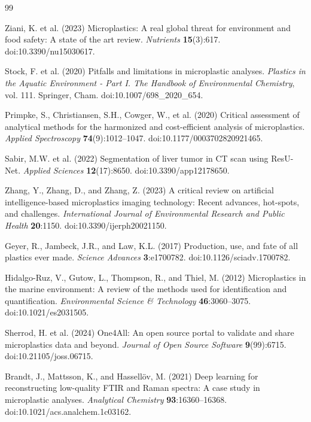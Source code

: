 \documentclass{article}
\begin{document}
{\small

\begin{thebibliography}{99}

Ziani, K. et al. (2023) Microplastics: A real global threat for environment and food safety: A state of the art review. \textit{Nutrients} \textbf{15}(3):617. doi:10.3390/nu15030617.

Stock, F. et al. (2020) Pitfalls and limitations in microplastic analyses. \textit{Plastics in the Aquatic Environment - Part I. The Handbook of Environmental Chemistry}, vol. 111. Springer, Cham. doi:10.1007/698\_2020\_654.

Primpke, S., Christiansen, S.H., Cowger, W., et al. (2020) Critical assessment of analytical methods for the harmonized and cost-efficient analysis of microplastics. \textit{Applied Spectroscopy} \textbf{74}(9):1012--1047. doi:10.1177/0003702820921465.

Sabir, M.W. et al. (2022) Segmentation of liver tumor in CT scan using ResU-Net. \textit{Applied Sciences} \textbf{12}(17):8650. doi:10.3390/app12178650.

Zhang, Y., Zhang, D., and Zhang, Z. (2023) A critical review on artificial intelligence-based microplastics imaging technology: Recent advances, hot-spots, and challenges. \textit{International Journal of Environmental Research and Public Health} \textbf{20}:1150. doi:10.3390/ijerph20021150.

Geyer, R., Jambeck, J.R., and Law, K.L. (2017) Production, use, and fate of all plastics ever made. \textit{Science Advances} \textbf{3}:e1700782. doi:10.1126/sciadv.1700782.

Hidalgo-Ruz, V., Gutow, L., Thompson, R., and Thiel, M. (2012) Microplastics in the marine environment: A review of the methods used for identification and quantification. \textit{Environmental Science \& Technology} \textbf{46}:3060--3075. doi:10.1021/es2031505.

Sherrod, H. et al. (2024) One4All: An open source portal to validate and share microplastics data and beyond. \textit{Journal of Open Source Software} \textbf{9}(99):6715. doi:10.21105/joss.06715.

Brandt, J., Mattsson, K., and Hassell\"ov, M. (2021) Deep learning for reconstructing low-quality FTIR and Raman spectra: A case study in microplastic analyses. \textit{Analytical Chemistry} \textbf{93}:16360--16368. doi:10.1021/acs.analchem.1c03162.


\end{thebibliography}}
\end{document}

